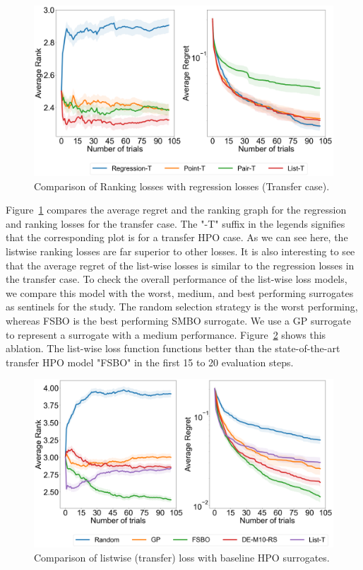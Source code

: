 \documentclass[12pt, twoside, ngerman]{report}
\begin{document}
\begin{figure}[h]
  \centering
    \includegraphics[scale=0.25]{images/Q1AblationTransfer}
    \caption{Comparison of Ranking losses with regression losses (Transfer case).}
    \label{fig:Q1AblationTransfer}
\end{figure}

Figure~\ref{fig:Q1AblationTransfer} compares the average regret and the ranking graph for the regression and ranking losses for the transfer case.
The "-T" suffix in the legends signifies that the corresponding plot is for a transfer HPO case.
As we can see here,  the listwise ranking losses are far superior to other losses.
It is also interesting to see that the average regret of the list-wise losses is similar to the regression losses in the transfer case.
To check the overall performance of the list-wise loss models, we compare this model with the worst,  medium, and best performing surrogates as sentinels for the study.
The random selection strategy is the worst performing,  whereas FSBO is the best performing SMBO surrogate. We use a GP surrogate to represent a surrogate with a medium performance.
Figure~\ref{fig:Q1FinalAblation} shows this ablation.
The list-wise loss function functions better than the state-of-the-art transfer HPO model "FSBO" in the first 15 to 20 evaluation steps.

\begin{figure}[h]
  \centering
    \includegraphics[scale=0.25]{images/Q1FinalAblation}
    \caption{Comparison of listwise (transfer) loss with baseline HPO surrogates.}
    \label{fig:Q1FinalAblation}
\end{figure}
\end{document}
